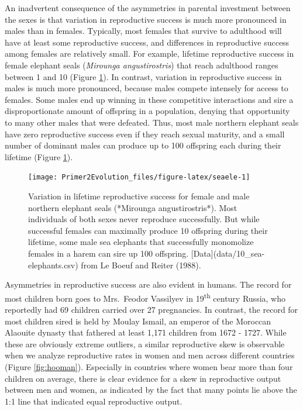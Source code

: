 \documentclass[
]{book}
\begin{document}
An inadvertent consequence of the asymmetries in parental investment between the sexes is that variation in reproductive success is much more pronounced in males than in females. Typically, most females that survive to adulthood will have at least some reproductive success, and differences in reproductive success among females are relatively small. For example, lifetime reproductive success in female elephant seals (\emph{Mirounga angustirostris}) that reach adulthood ranges between 1 and 10 (Figure \ref{fig:seaele}). In contrast, variation in reproductive success in males is much more pronounced, because males compete intensely for access to females. Some males end up winning in these competitive interactions and sire a disproportionate amount of offspring in a population, denying that opportunity to many other males that were defeated. Thus, most male northern elephant seals have zero reproductive success even if they reach sexual maturity, and a small number of dominant males can produce up to 100 offspring each during their lifetime (Figure \ref{fig:seaele}).

\begin{figure}
\texttt{[image: Primer2Evolution\_files/figure-latex/seaele-1]} \caption{Variation in lifetime reproductive success for female and male northern elephant seals (*Mirounga angustirostris*). Most individuals of both sexes never reproduce successfully. But while successful females can maximally produce 10 offspring during their lifetime, some male sea elephants that successfully monomolize females in a harem can sire up 100 offspring. [Data](data/10_sea-elephants.csv) from Le Boeuf and Reiter (1988).}\label{fig:seaele}
\end{figure}

Asymmetries in reproductive success are also evident in humans. The record for most children born goes to Mrs.~Feodor Vassilyev in 19\textsuperscript{th} century Russia, who reportedly had 69 children carried over 27 pregnancies. In contrast, the record for most children sired is held by Moulay Ismail, an emperor of the Moroccan Alaouite dynasty that fathered at least 1,171 children from 1672 - 1727. While these are obviously extreme outliers, a similar reproductive skew is observable when we analyze reproductive rates in women and men across different countries (Figure \ref{fig:hooman}). Especially in countries where women bear more than four children on average, there is clear evidence for a skew in reproductive output between men and women, as indicated by the fact that many points lie above the 1:1 line that indicated equal reproductive output.
\end{document}
